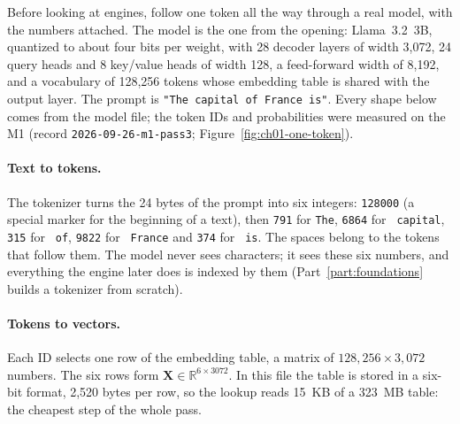 Before looking at engines, follow one token all the way through a real model,
with the numbers attached. The model is the one from the opening: Llama~3.2~3B,
quantized to about four bits per weight, with 28 decoder layers of width 3,072,
24 query heads and 8 key/value heads of width 128, a feed-forward width of
8,192, and a vocabulary of 128,256 tokens whose embedding table is shared with
the output layer. The prompt is \texttt{"The capital of France is"}. Every
shape below comes from the model file; the token IDs and probabilities were
measured on the M1 (record \texttt{2026-09-26-m1-pass3};
Figure~\ref{fig:ch01-one-token}).


\paragraph{Text to tokens.} The tokenizer turns the 24 bytes of the prompt
into six integers: \texttt{128000} (a special marker for the beginning of a
text), then \texttt{791} for \texttt{The}, \texttt{6864} for \texttt{\ capital},
\texttt{315} for \texttt{\ of}, \texttt{9822} for \texttt{\ France} and
\texttt{374} for \texttt{\ is}. The spaces belong to the tokens that follow
them. The model never sees characters; it sees these six numbers, and
everything the engine later does is indexed by them (Part~\ref{part:foundations}
builds a tokenizer from scratch).

\paragraph{Tokens to vectors.} Each ID selects one row of the embedding
table, a matrix of $128{,}256 \times 3{,}072$ numbers. The six rows form
$\mathbf{X} \in \mathbb{R}^{6 \times 3072}$. In this file the table is stored in
a six-bit format, 2,520 bytes per row, so the lookup reads 15~KB of a 323~MB
table: the cheapest step of the whole pass.

